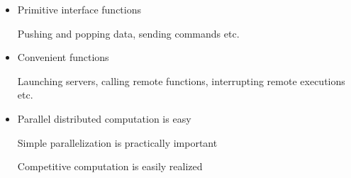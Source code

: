 \begin{slide}{}

\begin{itemize}
\item Primitive interface functions

Pushing and popping data, sending commands etc.

\item Convenient functions

Launching servers, calling remote functions,
 interrupting remote executions etc.

\item Parallel distributed computation is easy

Simple parallelization is practically important

Competitive computation is easily realized 
\end{itemize}
\end{slide}


